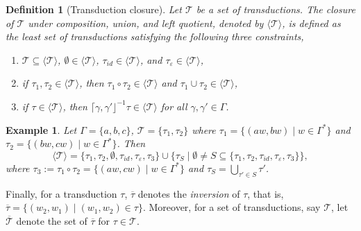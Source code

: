 \documentclass[preprint,12pt]{elsarticle}
\newtheorem{definition}{Definition}
\newtheorem{example}{Example}
\newcommand\TranSet{{\mathscr{T} }}
\begin{document}
\begin{definition}[Transduction closure]
Let $\TranSet$ be a set of transductions. The \emph{closure of $\TranSet$ under composition, union, and left quotient}, denoted by $\langle\TranSet \rangle $, is defined as the least set of transductions satisfying the following three constraints,
\begin{enumerate}
    \item $\TranSet \subseteq \langle\TranSet \rangle $, $\emptyset \in \langle\TranSet \rangle $, $\tau_{id} \in \langle\TranSet \rangle $, and $\tau_{\varepsilon} \in \langle\TranSet \rangle $,
%
    \item if $\tau_1, \tau_2 \in \langle\TranSet \rangle $, then $\tau_1 \circ \tau_2 \in \langle\TranSet \rangle $ and $\tau_1 \cup \tau_2 \in \langle\TranSet \rangle $,
%
    \item if $\tau \in \langle\TranSet \rangle $, then $\lceil \gamma, \gamma' \rfloor^{-1} \tau \in \langle\TranSet \rangle $ for all $\gamma, \gamma' \in \Gamma$.
\end{enumerate}
\end{definition}

\begin{example}
Let $\Gamma = \{a, b, c\}$, $\TranSet = \{\tau_1, \tau_2\}$ where $\tau_1 = \{(aw, bw) \mid w \in \Gamma^*\}$ and $\tau_2 = \{(bw, cw) \mid w \in \Gamma^*\}$. Then 
$$\langle \TranSet \rangle = \{\tau_1, \tau_2, \emptyset, \tau_{id}, \tau_\varepsilon, \tau_3\} \cup  \{\tau_S \mid \emptyset \neq S \subseteq \{\tau_1, \tau_2, \tau_{id}, \tau_\varepsilon, \tau_3\} \},$$
where $\tau_3 := \tau_1 \circ \tau_2 = \{(aw, cw) \mid w \in \Gamma^*\}$ and $\tau_S = \bigcup \limits_{\tau' \in S} \tau'$. 
\end{example}

Finally, for a transduction $\tau$, $\overline{\tau}$ denotes the \emph{inversion} of $\tau$, that is, $\overline{\tau} = \{(w_2, w_1) \mid (w_1, w_2) \in \tau\}$. Moreover, for a set of transductions, say $\TranSet$, let $\overline{\TranSet}$  denote the set of $\overline{\tau}$ for $\tau \in \TranSet$.  
\end{document}
